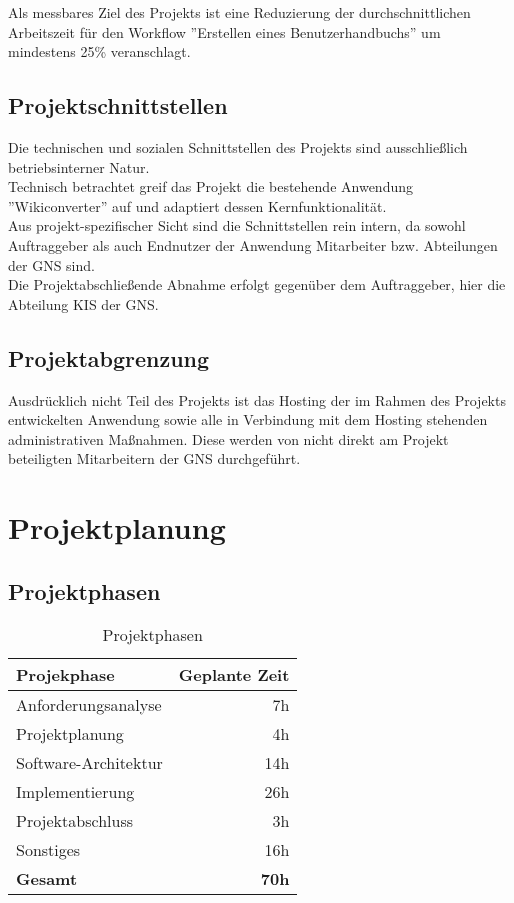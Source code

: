 \documentclass[12pt, xcolor=dvipsnames]{scrartcl}
\begin{document}
Als messbares Ziel des Projekts ist eine Reduzierung der durchschnittlichen Arbeitszeit für den Workflow ''Erstellen eines Benutzerhandbuchs'' um mindestens 25\% veranschlagt.


\subsection{Projektschnittstellen}

Die technischen und sozialen Schnittstellen des Projekts sind ausschließlich betriebsinterner Natur. \\
Technisch betrachtet greif das Projekt die bestehende Anwendung ''Wikiconverter'' auf und adaptiert dessen Kernfunktionalität. \\
Aus projekt-spezifischer Sicht sind die Schnittstellen rein intern, da sowohl Auftraggeber als auch Endnutzer der Anwendung Mitarbeiter bzw. Abteilungen der GNS sind. \\
Die Projektabschließende Abnahme erfolgt gegenüber dem Auftraggeber, hier die Abteilung KIS der GNS.


\subsection{Projektabgrenzung}
\label{sec:projektabgrenzung}

Ausdrücklich nicht Teil des Projekts ist das Hosting der im Rahmen des Projekts entwickelten Anwendung sowie alle in Verbindung mit dem Hosting stehenden administrativen Maßnahmen. Diese werden von nicht direkt am Projekt beteiligten Mitarbeitern der GNS durchgeführt.


\section{Projektplanung}

\subsection{Projektphasen}

	\begin{table}[H]
	\centering
	\begin{tabular}{lr}

		\rowcolor{white!15}				
		\textbf{Projekphase} & \textbf{Geplante Zeit} \\\hline
		
	    Anforderungsanalyse & 7h \\	   	   
	    Projektplanung & 4h \\	   			
	    Software-Architektur & 14h \\	 				
	    Implementierung & 26h \\	   				
	    Projektabschluss & 3h \\	   				
	    Sonstiges & 16h \\\hline
	  		
		\rowcolor{white!15}				
		\textbf{Gesamt} & \textbf{70h}				
			    
	\end{tabular}
	\caption{Projektphasen}
	\label{tab:projektphasen}
	\end{table}
	
\end{document}
